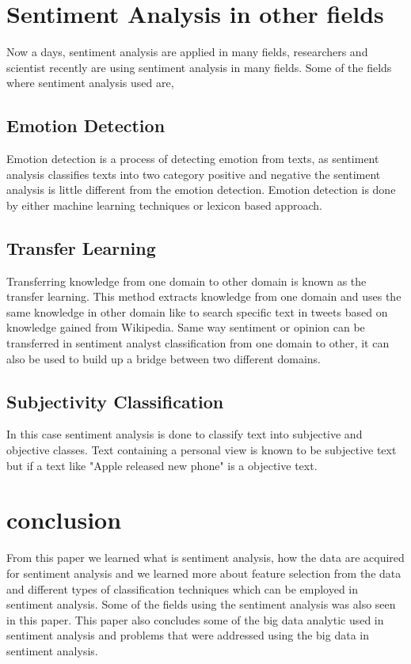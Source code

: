 \documentclass[sigconf]{acmart}
\begin{document}
\section{Sentiment Analysis in other fields}
Now a days, sentiment analysis are applied in many fields, researchers and scientist recently are using sentiment analysis in many fields. Some of the fields where sentiment analysis used are,

\subsection{Emotion Detection}
Emotion detection is a process of detecting emotion from texts, as sentiment analysis classifies texts into two category positive and negative the sentiment analysis is little different from the emotion detection. Emotion detection is done by either machine learning techniques or lexicon based approach.  
\subsection{Transfer Learning}
Transferring knowledge from one domain to other domain is known as the transfer learning. This method extracts knowledge from one domain and uses the same knowledge in other domain like to search specific text in tweets based on knowledge gained from Wikipedia. Same way sentiment or opinion can be transferred in sentiment analyst classification from one domain to other, it can also be used to build up a bridge between two different domains.
\subsection{Subjectivity Classification}
In this case sentiment analysis is done to classify text into subjective and objective classes. Text containing a personal view is known to be subjective text but if a text like "Apple released new phone" is a objective text.

\section{conclusion}

From this paper we learned what is sentiment analysis, how the data are acquired for sentiment analysis and we learned more about feature selection from the data and different types of classification techniques which can be employed in sentiment analysis. Some of the fields using the sentiment analysis was also seen in this paper. This paper also concludes some of the big data analytic used in sentiment analysis and problems that were addressed using the big data in sentiment analysis.


 
\end{document}
